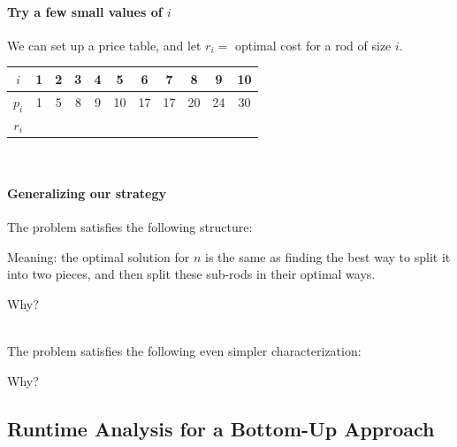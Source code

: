 \documentclass[11  pt]{article}
\begin{document}
\paragraph{Try a few small values of $i$}
We can set up a price table, and let $r_i = $ optimal cost for a rod of size $i$.\\

{\Huge
\begin{center}
	\begin{tabular}{c | c | c | c | c | c | c | c | c | c | c }
		$i$ & 1 & 2 & 3 & 4 & 5 & 6 & 7 & 8 & 9 & 10 \\
		\hline
		$p_i$ & 1 & 5 & 8 & 9 & 10 & 17 & 17 & 20 & 24 & 30  \\
		\hline
		$r_i$ &  & & & & & & & & & 
	\end{tabular} \\
\end{center}
}

\newpage
\paragraph{Generalizing our strategy}

\vs{2cm}

\begin{theorem}
The problem satisfies the following structure:

\vs{2cm}

Meaning: the optimal solution for $n$ is the same as finding the best way to split it into two pieces, and then split these sub-rods in their optimal ways.
\end{theorem}

\vs{4cm}

Why? \\ \\%
\vs{3cm}

\begin{theorem}
The problem satisfies the following even simpler characterization:
\vs{3cm}
\end{theorem}
Why?

\newpage

\subsection{Runtime Analysis for a Bottom-Up Approach}
\end{document}
